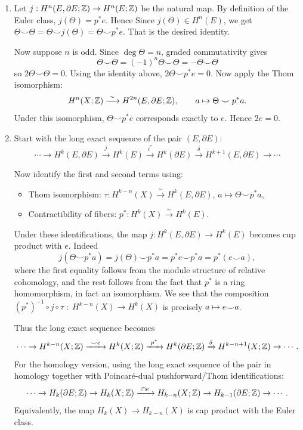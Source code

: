 \documentclass[12pt]{article}  %
\begin{document}
\begin{solution}
\begin{enumerate}
    \item Let $j : H^n(E,\partial E;\mathbb{Z}) \to H^n(E;\mathbb{Z})$ be the natural map. By definition of the Euler class,
    $j(\Theta) = p^*e$. Hence
    Since $j(\Theta) \in H^n(E)$, we get
    $\Theta \smile \Theta = \Theta \smile j(\Theta) = \Theta \smile p^*e$.
    That is the desired identity.

    Now suppose $n$ is odd. Since $\deg \Theta = n$, graded commutativity gives
    \[\Theta \smile \Theta = (-1)^n \Theta \smile \Theta = -\Theta \smile \Theta\]
    so $2\Theta \smile \Theta = 0$.
    Using the identity above, $2\Theta \smile p^*e = 0$. Now apply the Thom isomorphism:
    \[
    H^n(X;\mathbb{Z}) \xrightarrow{\;\sim\;} H^{2n}(E,\partial E;\mathbb{Z}), \qquad a \mapsto \Theta \smile p^*a.
    \]
    Under this isomorphism, $\Theta \smile p^*e$ corresponds exactly to $e$. Hence $2e = 0$.

    \item Start with the long exact sequence of the pair $(E,\partial E)$:
    \[
    \cdots \to H^k(E,\partial E) \xrightarrow{j} H^k(E) \xrightarrow{i^*} H^k(\partial E) \xrightarrow{\delta} H^{k+1}(E,\partial E) \to \cdots
    \]

    Now identify the first and second terms using:
    \begin{itemize}
        \item Thom isomorphism: $\tau :
        H^{k-n}(X) \xrightarrow{\;\sim\;} H^k(E,\partial E)$, $a \mapsto \Theta \smile p^*a$,
        \item Contractibility of fibers: $p^* : H^k(X) \xrightarrow{\sim} H^k(E)$.
    \end{itemize}

    Under these identifications, the map $j : H^k(E,\partial E) \to H^k(E)$ becomes cup product with $e$. Indeed
    \[
    j(\Theta \smile p^*a) = j(\Theta) \smile p^*a = p^*e \smile p^*a = p^*(e \smile a),
    \] where the first equality follows from the module structure of relative cohomology, and the rest follows from the fact that $p^*$ is a ring homomorphism, in fact an isomorphism. We see that the composition $(p^*)^{-1}\circ j\circ \tau
\;:\;
H^{k-n}(X)\to H^k(X)$ is precisely $a \longmapsto e \smile a$.

    Thus the long exact sequence becomes
    \[
    \cdots \to H^{k-n}(X;\Z) \xrightarrow{\ \smile e\ } H^k(X;\Z) \xrightarrow{\ p^*\ } H^k(\partial E;\Z) \xrightarrow{\delta} H^{k-n+1}(X;\Z) \to \cdots.
    \]
    For the homology version, using the long exact sequence of the pair in homology together with Poincaré-dual pushforward/Thom identifications:
    \[
    \cdots \to H_k(\partial E;\mathbb{Z}) \to H_k(X;\mathbb{Z}) \xrightarrow{\ \cap e\ } H_{k-n}(X;\mathbb{Z}) \to H_{k-1}(\partial E;\mathbb{Z}) \to \cdots.
    \]
    Equivalently, the map $H_k(X) \to H_{k-n}(X)$ is cap product with the Euler class.


\end{enumerate}
\end{solution}
\end{document}
